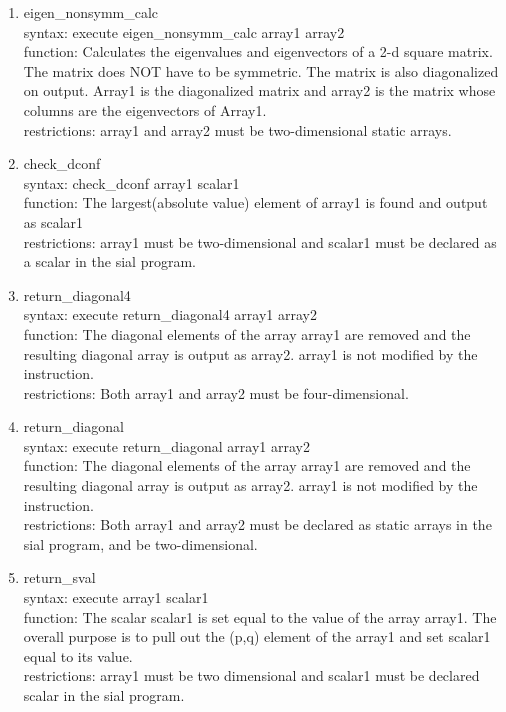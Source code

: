 \documentclass[12pt]{article}
\begin{document}
\begin{enumerate}
\item eigen\_nonsymm\_calc\\ 
syntax: execute eigen\_nonsymm\_calc array1 array2\\ 
function: Calculates the eigenvalues and eigenvectors of a 2-d square matrix. The matrix 
does NOT have to be symmetric. The matrix is also diagonalized on output. Array1 is the 
diagonalized matrix and array2 is the matrix whose columns are the eigenvectors of Array1.\\ 
restrictions: array1 and array2 must be two-dimensional static arrays.

\item check\_dconf\\ 
syntax: check\_dconf array1 scalar1\\ 
function: The largest(absolute value) element of array1 is found and output as scalar1\\ 
restrictions: array1 must be two-dimensional and scalar1 must be declared as a scalar in 
the sial program.

\item return\_diagonal4\\ 
syntax: execute return\_diagonal4 array1 array2\\ 
function: The diagonal elements of the array array1 are removed and the resulting diagonal 
array is output as array2. array1 is not modified by the instruction.\\ 
restrictions: Both array1 and array2 must be four-dimensional.

\item return\_diagonal\\ 
syntax: execute return\_diagonal array1 array2\\ 
function: The diagonal elements of the array array1 are removed and the resulting diagonal 
array is output as array2. array1 is not modified by the instruction.\\ 
restrictions: Both array1 and array2 must be declared as static arrays in the sial program, and 
be two-dimensional.

\item return\_sval\\
syntax: execute array1 scalar1\\ 
function: The scalar scalar1 is set equal to the value of the array array1. The overall 
purpose is to pull out the (p,q) element of the array1 and set scalar1 equal to its value.\\ 
restrictions: array1 must be two dimensional and scalar1 must be declared scalar in the sial 
program.


\end{enumerate}
\end{document}

